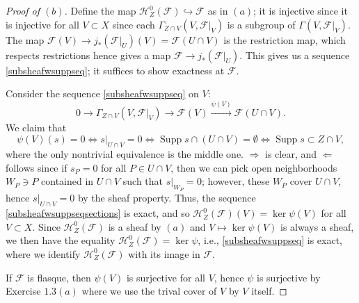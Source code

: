 \documentclass[10pt]{article}
\theoremstyle{definition}
\theoremstyle{remark}
\numberwithin{equation}{section}
\numberwithin{figure}{subsubsection}
\DeclareMathOperator{\Supp}{Supp}
\begin{document}
\begin{proof}[Proof of $(b)$]
  Define the map $\mathscr{H}_Z^0(\mathscr{F}) \hookrightarrow \mathscr{F}$ as in $(a)$; it is injective since it is injective for all $V \subset X$ since each $\Gamma_{Z \cap V}(V,\mathscr{F}\vert_V)$ is a subgroup of $\Gamma(V,\mathscr{F}\vert_V)$. The map $\mathscr{F}(V) \to j_*(\mathscr{F}\vert_U)(V) = \mathscr{F}(U \cap V)$ is the restriction map, which respects restrictions hence gives a map $\mathscr{F} \to j_*(\mathscr{F}\vert_U)$. This gives us a sequence \eqref{subsheafwsuppseq}; it suffices to show exactness at $\mathscr{F}$.
  \par Consider the sequence \eqref{subsheafwsuppseq} on $V$:
  \begin{equation}\label{subsheafwsuppseqsections}
    0 \longrightarrow \Gamma_{Z\cap V}(V,\mathscr{F}\vert_V) \longrightarrow \mathscr{F}(V) \overset{\psi(V)}{\longrightarrow} \mathscr{F}(U \cap V).
  \end{equation}
  We claim that
  \begin{equation*}
    \psi(V)(s) = 0 \iff s\vert_{U \cap V} = 0 \iff \Supp s \cap (U \cap V) = \emptyset \iff \Supp s \subset Z \cap V,
  \end{equation*}
  where the only nontrivial equivalence is the middle one. $\Rightarrow$ is clear, and $\Leftarrow$ follows since if $s_P = 0$ for all $P \in U \cap V$, then we can pick open neighborhoods $W_P \ni P$ contained in $U \cap V$ such that $s\vert_{W_P} = 0$; however, these $W_P$ cover $U \cap V$, hence $s\vert_{U \cap V} = 0$ by the sheaf property. Thus, the sequence \eqref{subsheafwsuppseqsections} is exact, and so $\mathscr{H}_Z^0(\mathscr{F})(V) = \ker\psi(V)$ for all $V \subset X$. Since $\mathscr{H}_Z^0(\mathscr{F})$ is a sheaf by $(a)$ and $V \mapsto \ker\psi(V)$ is always a sheaf, we then have the equality $\mathscr{H}_Z^0(\mathscr{F}) = \ker\psi$, i.e., \eqref{subsheafwsuppseq} is exact, where we identify $\mathscr{H}_Z^0(\mathscr{F})$ with its image in $\mathscr{F}$.
  \par If $\mathscr{F}$ is flasque, then $\psi(V)$ is surjective for all $V$,
  hence $\psi$ is surjective by Exercise $1.3(a)$ where we use the trival cover of $V$ by $V$ itself.
\end{proof}
\end{document}
